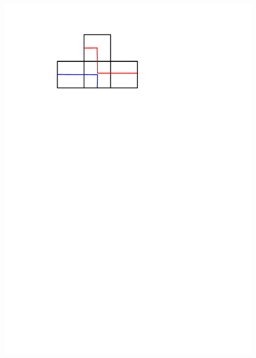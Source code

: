 \documentclass[portrait,final,a0paper,fontscale=0.25]{baposter}
\theoremstyle{definition}
\begin{document}
\begin{poster}
{\hspace*{.15cm}\includegraphics[scale=.32]{ShyKiss}
}
\end{poster}
\end{document}
